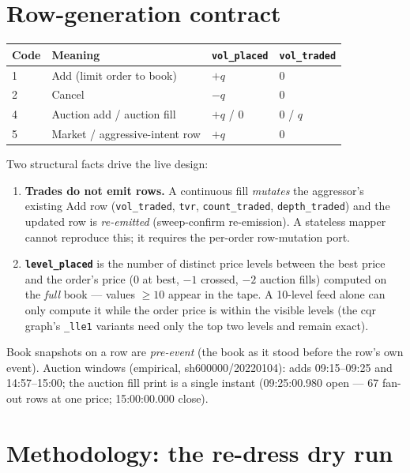 \documentclass[11pt,a4paper]{article}
\begin{document}
\section{Row-generation contract}
\label{sec:contract}

\begin{center}
\begin{tabular}{llll}
\toprule
Code & Meaning & \texttt{vol\_placed} & \texttt{vol\_traded} \\
\midrule
1 & Add (limit order to book) & $+q$ & 0 \\
2 & Cancel & $-q$ & 0 \\
4 & Auction add / auction fill & $+q$ / $0$ & $0$ / $q$ \\
5 & Market / aggressive-intent row & $+q$ & 0 \\
\bottomrule
\end{tabular}
\end{center}

Two structural facts drive the live design:
\begin{enumerate}
  \item \textbf{Trades do not emit rows.} A continuous fill \emph{mutates}
        the aggressor's existing Add row (\texttt{vol\_traded}, \texttt{tvr},
        \texttt{count\_traded}, \texttt{depth\_traded}) and the updated row is
        \emph{re-emitted} (sweep-confirm re-emission). A stateless mapper
        cannot reproduce this; it requires the per-order row-mutation port.
  \item \textbf{\texttt{level\_placed}} is the number of distinct price
        levels between the best price and the order's price (0 at best,
        $-1$ crossed, $-2$ auction fills) computed on the \emph{full} book
        --- values $\geq 10$ appear in the tape. A 10-level feed alone can
        only compute it while the order price is within the visible levels
        (the cqr graph's \texttt{\_lle1} variants need only the top two
        levels and remain exact).
\end{enumerate}

Book snapshots on a row are \emph{pre-event} (the book as it stood before the
row's own event). Auction windows (empirical, sh600000/20220104): adds
09:15--09:25 and 14:57--15:00; the auction fill print is a single instant
(09:25:00.980 open --- 67 fan-out rows at one price; 15:00:00.000 close).

\section{Methodology: the re-dress dry run}
\label{sec:method}
\end{document}
